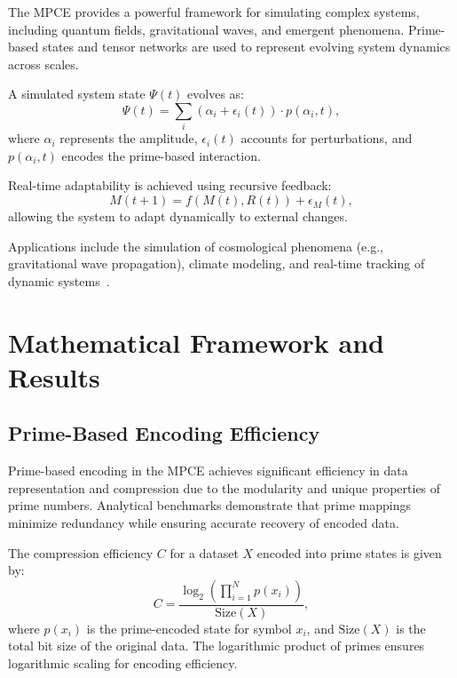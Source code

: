 \documentclass{article}
\theoremstyle{plain}
\begin{document}
The MPCE provides a powerful framework for simulating complex systems, including quantum fields, gravitational waves, and emergent phenomena. Prime-based states and tensor networks are used to represent evolving system dynamics across scales.

A simulated system state \( \Psi(t) \) evolves as:
\begin{equation}
    \Psi(t) = \sum_{i} \left( \alpha_i + \epsilon_i(t) \right) \cdot p(\alpha_i, t),
\end{equation}
where \( \alpha_i \) represents the amplitude, \( \epsilon_i(t) \) accounts for perturbations, and \( p(\alpha_i, t) \) encodes the prime-based interaction.

Real-time adaptability is achieved using recursive feedback:
\begin{equation}
    M(t+1) = f(M(t), R(t)) + \epsilon_M(t),
\end{equation}
allowing the system to adapt dynamically to external changes.

Applications include the simulation of cosmological phenomena (e.g., gravitational wave propagation), climate modeling, and real-time tracking of dynamic systems~\cite{feynman2010quantum, wang2021quantum}.

\section{Mathematical Framework and Results}

\subsection{Prime-Based Encoding Efficiency}

Prime-based encoding in the MPCE achieves significant efficiency in data representation and compression due to the modularity and unique properties of prime numbers. Analytical benchmarks demonstrate that prime mappings minimize redundancy while ensuring accurate recovery of encoded data.

The compression efficiency \( C \) for a dataset \( X \) encoded into prime states is given by:
\begin{equation}
    C = \frac{\log_2 \left( \prod_{i=1}^N p(x_i) \right)}{\text{Size}(X)},
\end{equation}
where \( p(x_i) \) is the prime-encoded state for symbol \( x_i \), and \( \text{Size}(X) \) is the total bit size of the original data. The logarithmic product of primes ensures logarithmic scaling for encoding efficiency.
\end{document}
